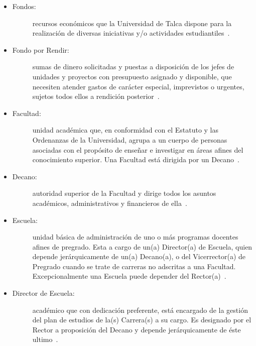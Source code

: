 \begin{itemize}
	\item 	\begin{description}
			    \item[Fondos:] recursos  económicos  que  la  Universidad  de  Talca  dispone  para  la  realización  de diversas iniciativas y/o actividades estudiantiles~\cite{1}.
			\end{description}

	\item 	\begin{description}
			    \item[Fondo por Rendir:] sumas de dinero solicitadas y puestas a disposición de los jefes de unidades y proyectos con presupuesto asignado y disponible, que necesiten atender gastos de carácter especial, imprevistos o urgentes, sujetos todos ellos a rendición posterior~\cite{1}.
			\end{description}

	\item 	\begin{description}
			    \item[Facultad:] unidad académica que, en conformidad con el Estatuto y las Ordenanzas de la Universidad, agrupa a un cuerpo de personas asociadas con el propósito de enseñar e investigar en áreas afines del conocimiento superior. Una Facultad está dirigida por un Decano~\cite{1}.
			\end{description}

	\item 	\begin{description}
			    \item[Decano:] autoridad superior de la Facultad y dirige todos los asuntos académicos, administrativos y financieros de ella~\cite{1}.
			\end{description}

	\item 	\begin{description}
			    \item[Escuela:] unidad básica de administración de uno o más programas docentes afines de pregrado. Esta a cargo de un(a) Director(a) de Escuela, quien depende jerárquicamente de un(a) Decano(a), o del Vicerrector(a) de Pregrado cuando se trate de carreras no adscritas a una Facultad. Excepcionalmente una Escuela puede depender del Rector(a)~\cite{1}.
			\end{description}

	\item 	\begin{description}
				\item[Director de Escuela:] académico que con dedicación preferente, está encargado de la gestión del plan de estudios de la(s) Carrera(s) a su cargo. Es designado por el Rector a proposición del Decano y depende jerárquicamente de éste ultimo~\cite{1}.			\end{description}


\end{itemize}
